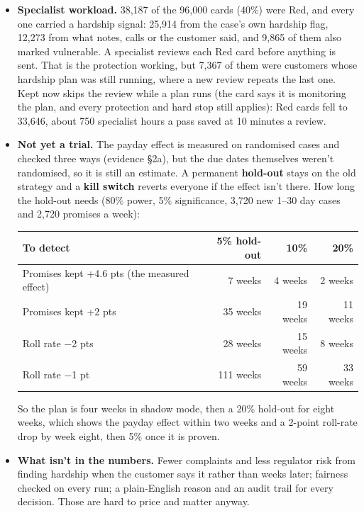 \documentclass[11pt]{article}
\begin{document}
\begin{itemize}
\item \textbf{Specialist workload.} 38,187 of the 96,000 cards (40\%) were Red, and every one carried a hardship
signal: 25,914 from the case's own hardship flag, 12,273 from what notes, calls or the customer said, and 9,865 of them
also marked vulnerable. A specialist reviews each Red card before anything is sent. That is the protection working, but 7,367 of
them were customers whose hardship plan was still running, where a new review repeats the last one. Kept now skips
the review while a plan runs (the card says it is monitoring the plan, and every protection and hard stop still
applies): Red cards fell to 33,646, about 750 specialist hours a pass saved at 10 minutes a review.
\item \textbf{Not yet a trial.} The payday effect is measured on randomised cases and checked three ways (evidence
§2a), but the due dates themselves weren't randomised, so it is still an estimate. A permanent \textbf{hold-out} stays
on the old strategy and a \textbf{kill switch} reverts everyone if the effect isn't there. How long the hold-out needs
(80\% power, 5\% significance, 3,720 new 1–30 day cases and 2,720 promises a week):

\begin{center}\small
\begin{tabular}{@{}lrrr@{}}
\toprule
\textbf{To detect} & \textbf{5\% hold-out} & \textbf{10\%} & \textbf{20\%} \\
\midrule
Promises kept +4.6 pts (the measured effect) & 7 weeks & 4 weeks & 2 weeks \\
Promises kept +2 pts & 35 weeks & 19 weeks & 11 weeks \\
Roll rate −2 pts & 28 weeks & 15 weeks & 8 weeks \\
Roll rate −1 pt & 111 weeks & 59 weeks & 33 weeks \\
\bottomrule
\end{tabular}
\end{center}

So the plan is four weeks in shadow mode, then a 20\% hold-out for eight weeks, which shows the payday effect within
two weeks and a 2-point roll-rate drop by week eight, then 5\% once it is proven.
\item \textbf{What isn't in the numbers.} Fewer complaints and less regulator risk from finding hardship when the customer
says it rather than weeks later; fairness checked on every run; a plain-English reason and an audit trail for every
decision. Those are hard to price and matter anyway.
\end{itemize}

\end{document}
